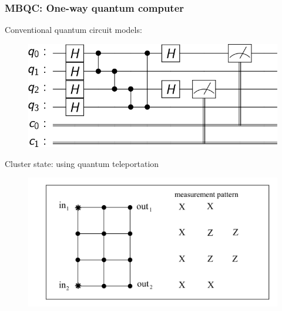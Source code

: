 \documentclass{beamer}
\theoremstyle{definition}
\begin{document}
\begin{frame}
\frametitle{MBQC: One-way quantum computer \cite{MBQC}}

Conventional quantum circuit models:

\begin{figure}[!htb]
	\includegraphics[scale=0.25]{circuit}
\end{figure}

Cluster state: \cite{jozsa} using quantum teleportation

\begin{figure}[!htb]
	\includegraphics[scale=0.18]{fig8}
\end{figure}


\end{frame}


%
%	
%
%
%
%
\end{document}
